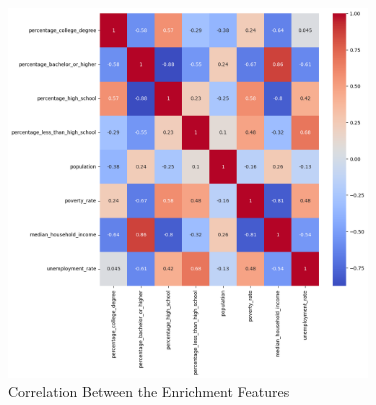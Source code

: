 \begin{figure}[h]
    \centering
    \includegraphics[width=0.85\textwidth]{images/CH03_Enrichment_Correlation.png}
    \caption{Correlation Between the Enrichment Features}
    \label{fig:CH03_Enrichment_Correlation}
\end{figure}